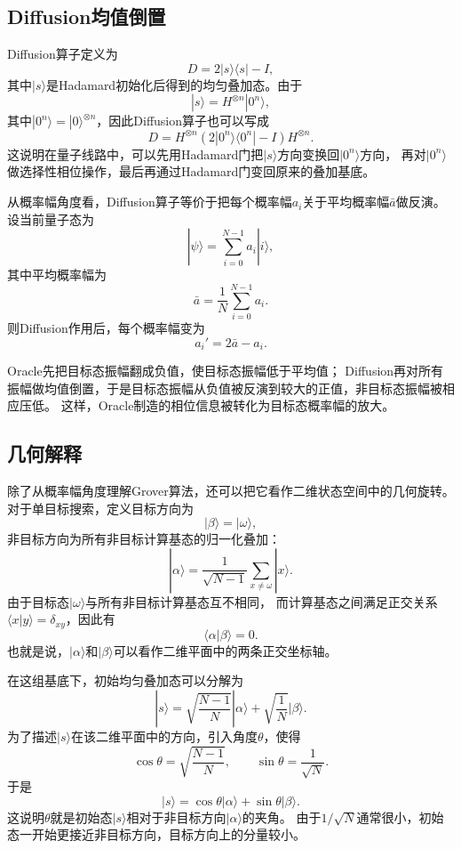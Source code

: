 \subsection{Diffusion均值倒置}

Diffusion算子定义为
\[
    D=2|s\rangle\langle s|-I,
\]
其中\(|s\rangle\)是Hadamard初始化后得到的均匀叠加态。由于
\[
    |s\rangle=H^{\otimes n}|0^n\rangle,
\]
其中\(|0^n\rangle=|0\rangle^{\otimes n}\)，因此Diffusion算子也可以写成
\[
    D
    =H^{\otimes n}\left(2|0^n\rangle\langle 0^n|-I\right)H^{\otimes n}.
\]
这说明在量子线路中，可以先用Hadamard门把\(|s\rangle\)方向变换回\(|0^n\rangle\)方向，
再对\(|0^n\rangle\)做选择性相位操作，最后再通过Hadamard门变回原来的叠加基底。

从概率幅角度看，Diffusion算子等价于把每个概率幅\(a_i\)关于平均概率幅\(\bar{a}\)做反演。
设当前量子态为
\[
    |\psi\rangle=\sum_{i=0}^{N-1}a_i|i\rangle,
\]
其中平均概率幅为
\[
    \bar{a}=\frac{1}{N}\sum_{i=0}^{N-1}a_i.
\]
则Diffusion作用后，每个概率幅变为
\[
    a_i' = 2\bar{a}-a_i.
\]

Oracle先把目标态振幅翻成负值，使目标态振幅低于平均值；
Diffusion再对所有振幅做均值倒置，于是目标态振幅从负值被反演到较大的正值，非目标态振幅被相应压低。
这样，Oracle制造的相位信息被转化为目标态概率幅的放大。

\subsection{几何解释}

除了从概率幅角度理解Grover算法，还可以把它看作二维状态空间中的几何旋转。
对于单目标搜索，定义目标方向为
\[
    |\beta\rangle=|\omega\rangle,
\]
非目标方向为所有非目标计算基态的归一化叠加：
\[
    |\alpha\rangle
    =\frac{1}{\sqrt{N-1}}
    \sum_{x\ne\omega}|x\rangle.
\]
由于目标态\(|\omega\rangle\)与所有非目标计算基态互不相同，
而计算基态之间满足正交关系\(\langle x|y\rangle=\delta_{xy}\)，因此有
\[
    \langle\alpha|\beta\rangle=0.
\]
也就是说，\(|\alpha\rangle\)和\(|\beta\rangle\)可以看作二维平面中的两条正交坐标轴。

在这组基底下，初始均匀叠加态可以分解为
\[
    |s\rangle
    =\sqrt{\frac{N-1}{N}}|\alpha\rangle
    +\sqrt{\frac{1}{N}}|\beta\rangle.
\]
为了描述\(|s\rangle\)在该二维平面中的方向，引入角度\(\theta\)，使得
\[
    \cos\theta=\sqrt{\frac{N-1}{N}},
    \qquad
    \sin\theta=\frac{1}{\sqrt{N}}.
\]
于是
\[
    |s\rangle=\cos\theta|\alpha\rangle+\sin\theta|\beta\rangle.
\]
这说明\(\theta\)就是初始态\(|s\rangle\)相对于非目标方向\(|\alpha\rangle\)的夹角。
由于\(1/\sqrt{N}\)通常很小，初始态一开始更接近非目标方向，目标方向上的分量较小。

